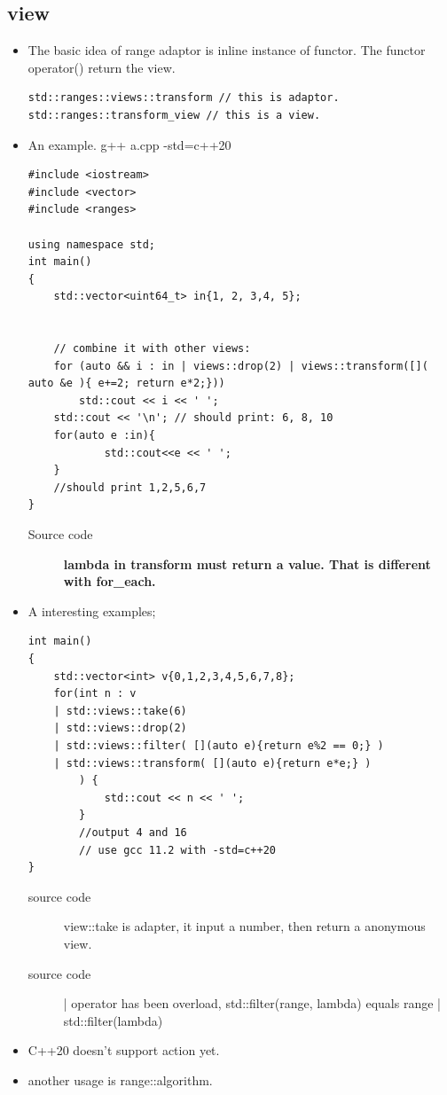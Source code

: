 \documentclass[a4paper,11pt,twoside]{book}
\begin{document}
\subsection{view}
\begin{itemize}
\item The basic idea of range adaptor is inline instance of functor. The functor operator() return the view. 

\begin{lstlisting}
std::ranges::views::transform // this is adaptor.
std::ranges::transform_view // this is a view.
\end{lstlisting}

\item An example. g++ a.cpp -std=c++20

\begin{lstlisting}
#include <iostream>
#include <vector>
#include <ranges> 

using namespace std;
int main()
{
    std::vector<uint64_t> in{1, 2, 3,4, 5};


    // combine it with other views:
    for (auto && i : in | views::drop(2) | views::transform([]( auto &e ){ e+=2; return e*2;}))
        std::cout << i << ' ';
    std::cout << '\n'; // should print: 6, 8, 10
	for(auto e :in){
			std::cout<<e << ' ';
	}
	//should print 1,2,5,6,7
}
\end{lstlisting}
\begin{description}
		\item[Source code] \textbf{lambda in transform must return a value. That is different with for\_each.} 
\end{description}

	\item A interesting examples;
\begin{lstlisting}
int main()
{
	std::vector<int> v{0,1,2,3,4,5,6,7,8};
	for(int n : v   
	| std::views::take(6)
	| std::views::drop(2)
	| std::views::filter( [](auto e){return e%2 == 0;} )
	| std::views::transform( [](auto e){return e*e;} )
		) {
			std::cout << n << ' ';
		}
		//output 4 and 16
		// use gcc 11.2 with -std=c++20
}
\end{lstlisting}	
\begin{description}
	\item[source code] view::take is adapter, it input a number, then return a anonymous view.
	\item[source code] | operator has been overload, std::filter(range, lambda) equals range | std::filter(lambda)
\end{description}
	\item C++20 doesn't support action yet. 
	\item another usage is range::algorithm. 


\end{itemize}
\end{document}
